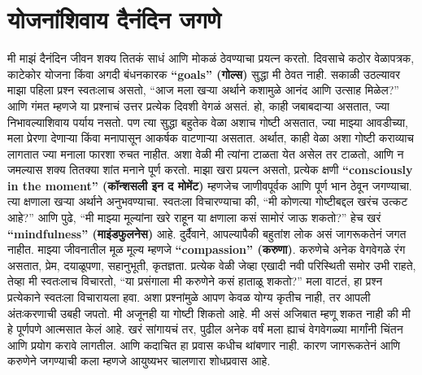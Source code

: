  \chapter{योजनांशिवाय दैनंदिन जगणे}
मी माझं दैनंदिन जीवन शक्य तितकं साधं आणि मोकळं ठेवण्याचा प्रयत्न करतो. दिवसाचे कठोर वेळापत्रक, काटेकोर योजना किंवा अगदी बंधनकारक \textbf{``goals'' (गोल्स)} सुद्धा मी ठेवत नाही. सकाळी उठल्यावर माझा पहिला प्रश्न स्वतःलाच असतो,  ``आज मला खऱ्या अर्थाने कशामुळे आनंद आणि उत्साह मिळेल?'' आणि गंमत म्हणजे या प्रश्नाचं उत्तर प्रत्येक दिवशी वेगळं असतं.
हो, काही जबाबदाऱ्या असतात, ज्या निभावल्याशिवाय पर्याय नसतो. पण त्या सुद्धा बहुतेक वेळा अशाच गोष्टी असतात, ज्या माझ्या आवडीच्या, मला प्रेरणा देणाऱ्या किंवा मनापासून आकर्षक वाटणाऱ्या असतात. अर्थात, काही वेळा अशा गोष्टी कराव्याच लागतात ज्या मनाला फारशा रुचत नाहीत. अशा वेळी मी त्यांना टाळता येत असेल तर टाळतो, आणि न जमल्यास शक्य तितक्या शांत मनाने पूर्ण करतो.
माझा खरा प्रयत्न असतो,  प्रत्येक क्षणी \textbf{``consciously in the moment'' (कॉन्शसली इन द मोमेंट)} म्हणजेच जाणीवपूर्वक आणि पूर्ण भान ठेवून जगण्याचा. त्या क्षणाला खऱ्या अर्थाने अनुभवण्याचा. स्वतःला विचारण्याचा की,  ``मी कोणत्या गोष्टीबद्दल खरंच उत्कट आहे?'' आणि पुढे, ``मी माझ्या मूल्यांना खरे राहून या क्षणाला कसं सामोरं जाऊ शकतो?'' हेच खरं \textbf{``mindfulness'' (माइंडफुलनेस)} आहे. दुर्दैवाने, आपल्यापैकी बहुतांश लोक असं जागरूकतेनं जगत नाहीत.
माझ्या जीवनातील मूळ मूल्य म्हणजे \textbf{``compassion'' (करुणा)}. करुणेचे अनेक वेगवेगळे रंग असतात,  प्रेम, दयाळूपणा, सहानुभूती, कृतज्ञता. प्रत्येक वेळी जेव्हा एखादी नवी परिस्थिती समोर उभी राहते, तेव्हा मी स्वतःलाच विचारतो,  ``या प्रसंगाला मी करुणेने कसं हाताळू शकतो?'' मला वाटतं, हा प्रश्न प्रत्येकाने स्वतःला विचारायला हवा. अशा प्रश्नांमुळे आपण केवळ योग्य कृतीच नाही, तर आपली अंतःकरणाची उबही जपतो.
मी अजूनही या गोष्टी शिकतो आहे. मी असं अजिबात म्हणू शकत नाही की मी हे पूर्णपणे आत्मसात केलं आहे. खरं सांगायचं तर, पुढील अनेक वर्षं मला ह्याचं वेगवेगळ्या मार्गांनी चिंतन आणि प्रयोग करावे लागतील. आणि कदाचित हा प्रवास कधीच थांबणार नाही. कारण जागरूकतेनं आणि करुणेने जगण्याची कला म्हणजे आयुष्यभर चालणारा शोधप्रवास आहे.

